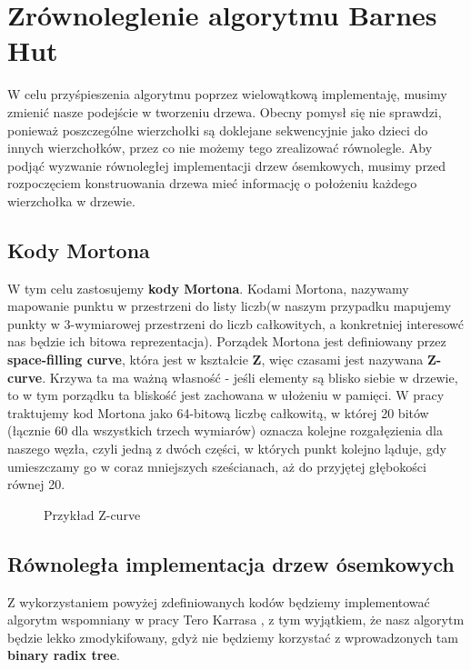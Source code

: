 \documentclass[14pt,twoside,a4paper]{article}
\theoremstyle{definition}
\begin{document}
\section{\LARGE Zrównoleglenie algorytmu Barnes Hut}

W celu przyśpieszenia algorytmu poprzez wielowątkową implementaję, musimy zmienić nasze podejście w tworzeniu drzewa. Obecny pomysł się nie sprawdzi, ponieważ poszczególne wierzchołki są doklejane sekwencyjnie jako dzieci do innych wierzchołków, przez co nie możemy tego zrealizować równolegle.
Aby podjąć wyzwanie równoległej implementacji drzew ósemkowych, musimy przed rozpoczęciem konstruowania drzewa mieć informację o położeniu każdego wierzchołka w drzewie.

\subsection{\Large Kody Mortona}
W tym celu zastosujemy \textbf{kody Mortona}.
Kodami Mortona, nazywamy mapowanie punktu w przestrzeni do listy liczb(w naszym przypadku mapujemy punkty w 3-wymiarowej przestrzeni do liczb całkowitych, a konkretniej interesowć nas będzie ich bitowa reprezentacja).
Porządek Mortona jest definiowany przez \textbf{space-filling curve}, która jest w kształcie \textbf{Z}, więc czasami jest nazywana \textbf{Z-curve}. Krzywa ta ma ważną własność - jeśli elementy są blisko siebie w drzewie, to w tym porządku ta bliskość jest zachowana w ułożeniu w pamięci. W pracy traktujemy kod Mortona jako 64-bitową liczbę całkowitą, w której 20 bitów (łącznie 60 dla wszystkich trzech wymiarów) oznacza kolejne rozgałęzienia dla naszego węzła, czyli jedną z dwóch części, w których punkt kolejno ląduje, gdy umieszczamy go w coraz mniejszych sześcianach, aż do przyjętej głębokości równej 20.

\begin{figure}[h]
    \centering      
    \def\svgscale{0.53}
    
    \caption{Przykład Z-curve}
    \label{fig:krzywa}
\end{figure}

\subsection{\Large Równoległa implementacja drzew ósemkowych}
Z wykorzystaniem powyżej zdefiniowanych kodów będziemy implementować algorytm wspomniany w pracy Tero Karrasa \cite{tero}, z tym wyjątkiem, że nasz algorytm będzie lekko zmodykifowany, gdyż nie będziemy korzystać z wprowadzonych tam \textbf{binary radix tree}.
\end{document}
